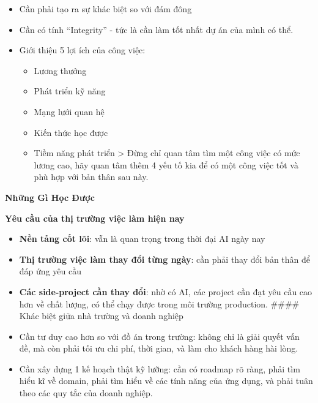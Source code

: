 \begin{itemize}
\tightlist
\item
  Cần phải tạo ra sự khác biệt so với đám đông
\item
  Cần có tính ``Integrity'' - tức là cần làm tốt nhất dự án của mình có
  thể.
\item
  Giới thiệu 5 lợi ích của công việc:

  \begin{itemize}
  \tightlist
  \item
    Lương thưởng
  \item
    Phát triển kỹ năng
  \item
    Mạng lưới quan hệ
  \item
    Kiến thức học được
  \item
    Tiềm năng phát triển \textgreater{} Đừng chỉ quan tâm tìm một công
    việc có mức lương cao, hãy quan tâm thêm 4 yếu tố kia để có một công
    việc tốt và phù hợp với bản thân sau này.
  \end{itemize}
\end{itemize}

\vspace{0.5em}\noindent\textbf{Những Gì Học
Được}\par

\vspace{0.5em}\noindent\textbf{Yêu cầu của thị trường việc làm hiện
nay}\par

\begin{itemize}
\tightlist
\item
  \textbf{Nền tảng cốt lõi}: vẫn là quan trọng trong thời đại AI ngày
  nay
\item
  \textbf{Thị trường việc làm thay đổi từng ngày}: cần phải thay đổi bản
  thân để đáp ứng yêu cầu
\item
  \textbf{Các side-project cần thay đổi}: nhờ có AI, các project cần đạt
  yêu cầu cao hơn về chất lượng, có thể chạy được trong môi trường
  production. \#\#\#\# Khác biệt giữa nhà trường và doanh nghiệp
\item
  Cần tư duy cao hơn so với đồ án trong trường: không chỉ là giải quyết
  vấn đề, mà còn phải tối ưu chi phí, thời gian, và làm cho khách hàng
  hài lòng.
\item
  Cần xây dựng 1 kế hoạch thật kỹ lưỡng: cần có roadmap rõ ràng, phải
  tìm hiểu kĩ về domain, phải tìm hiểu về các tính năng của ứng dụng, và
  phải tuân theo các quy tắc của doanh nghiệp.
\end{itemize}

